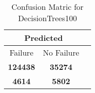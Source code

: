 \begin{table}[] 
\caption{Confusion Matric for DecisionTrees100} 
\label{Table: Prediction Accuracy-NoneDecisionTrees100SVMEKF-ignoreReflection100.9EKF-top2-Reflection} 
\centering 
\begin{tabular} 
 {@{}ccc@{}} 
\toprule 
\multicolumn{2}{c}{\textbf{Predicted}}
 \\ \midrule 
\multicolumn{1}{|c|}{Failure} & 
\multicolumn{1}{c|}{No Failure}
 \\ \midrule 
\multicolumn{1}{|c|}{\color{green}\textbf{124438}} & 
\multicolumn{1}{c|}{\color{green}\textbf{35274}}
 \\ \midrule 
\multicolumn{1}{|c|}{\color{red}\textbf{4614}} & 
\multicolumn{1}{c|}{\color{red}\textbf{5802}}
 \\ \bottomrule 
\end{tabular} 
\end{table} 
